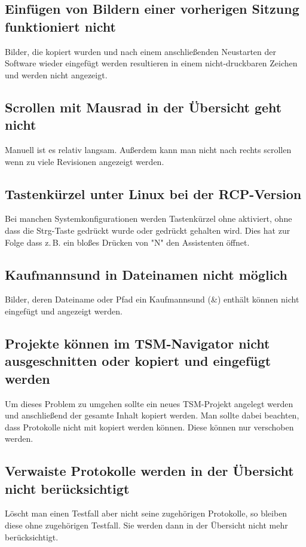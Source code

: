 \documentclass[11pt,a4paper,titlepage]{article}
\begin{document}
\subsection*{Einfügen von Bildern einer vorherigen Sitzung funktioniert nicht}
Bilder, die kopiert wurden und nach einem anschließenden Neustarten der Software wieder eingefügt werden resultieren in einem nicht-druckbaren Zeichen und werden nicht angezeigt.

\subsection*{Scrollen mit Mausrad in der Übersicht geht nicht}
Manuell ist es relativ langsam. Außerdem kann man nicht nach rechts scrollen wenn zu viele Revisionen angezeigt werden.

\subsection*{Tastenkürzel unter Linux bei der RCP-Version}
Bei manchen Systemkonfigurationen werden Tastenkürzel ohne aktiviert, ohne dass die Strg-Taste gedrückt wurde oder gedrückt gehalten wird. Dies hat zur Folge dass z.\,B. ein bloßes Drücken von "N" den Assistenten öffnet.

\subsection*{Kaufmannsund in Dateinamen nicht möglich}
Bilder, deren Dateiname oder Pfad ein Kaufmannsund (\&) enthält können nicht eingefügt und angezeigt werden.

\subsection*{Projekte können im TSM-Navigator nicht ausgeschnitten oder kopiert und eingefügt werden}
Um dieses Problem zu umgehen sollte ein neues TSM-Projekt angelegt werden und anschließend der gesamte Inhalt kopiert werden. Man sollte dabei beachten, dass Protokolle nicht mit kopiert werden können. Diese können nur verschoben werden.

\subsection*{Verwaiste Protokolle werden in der Übersicht nicht berücksichtigt}
Löscht man einen Testfall aber nicht seine zugehörigen Protokolle, so bleiben diese ohne zugehörigen Testfall. Sie werden dann in der Übersicht nicht mehr berücksichtigt.
\end{document}
